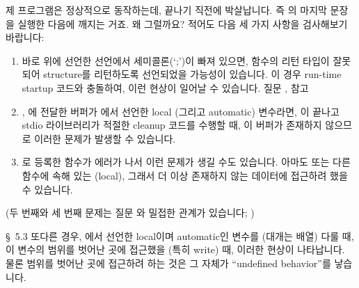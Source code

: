 \begin{faq}
	제 프로그램은 정상적으로 동작하는데, 끝나기 직전에 박살납니다.
	즉 의 마지막 문장을 실행한 다음에 깨지는 거죠.
	왜 그럴까요?
\A
	적어도 다음 세 가지 사항을 검사해보기 바랍니다:
        \begin{enumerate}
          \item {} 바로 위에 선언한 선언에서 세미콜론(`;')이 빠져 있으면,
             함수의 리턴 타입이 잘못되어 structure를 리턴하도록
            선언되었을 가능성이 있습니다. 이 경우 run-time startup 코드와
            충돌하여, 이런 현상이 일어날 수 있습니다. 질문 ,  참고
          \item {}, 에 전달한 버퍼가 에서 선언한
            local (그리고 automatic) 변수라면, 이 끝나고 stdio 라이브러리가
            적절한 cleanup 코드를 수행할 때, 이 버퍼가 존재하지 않으므로 이러한
            문제가 발생할 수 있습니다.
          \item {}로 등록한 함수가 에러가 나서 이런 문제가 생길 수도
            있습니다. 아마도  또는 다른 함수에 속해 있는 (local), 
            그래서 더 이상 존재하지 않는 데이터에 접근하려 했을 수 있습니다.
        \end{enumerate}

        \noindent (두 번째와 세 번째 문제는 질문 와 밀접한 관계가 있습니다;
        )

\R
	\cite{ctp} \S\ 5.3 
\T
	또다른 경우, 에서 선언한 local이며 automatic인 변수를 (대개는
        배열) 다룰 때, 이 변수의 범위를 벗어난 곳에 접근했을 (특히 write) 때,
        이러한 현상이 나타납니다. 물론 범위를 벗어난 곳에 접근하려 하는 것은
        그 자체가 ``undefined behavior''를 낳습니다.
\end{faq}

